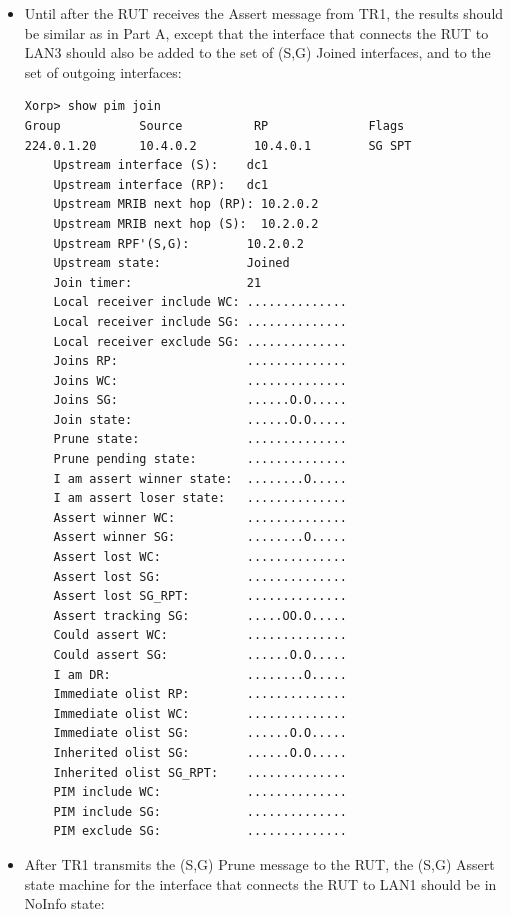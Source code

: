 \documentclass[11pt]{report}
\begin{document}

\begin{itemize}

  \item Until after the RUT receives the Assert message from TR1, the results
  should be similar as in Part A, except that the interface that connects the
  RUT to LAN3 should also be added to the set of (S,G) Joined interfaces, and
  to the set of outgoing interfaces:

\begin{verbatim}
Xorp> show pim join 
Group           Source          RP              Flags
224.0.1.20      10.4.0.2        10.4.0.1        SG SPT 
    Upstream interface (S):    dc1
    Upstream interface (RP):   dc1
    Upstream MRIB next hop (RP): 10.2.0.2
    Upstream MRIB next hop (S):  10.2.0.2
    Upstream RPF'(S,G):        10.2.0.2
    Upstream state:            Joined 
    Join timer:                21
    Local receiver include WC: ..............
    Local receiver include SG: ..............
    Local receiver exclude SG: ..............
    Joins RP:                  ..............
    Joins WC:                  ..............
    Joins SG:                  ......O.O.....
    Join state:                ......O.O.....
    Prune state:               ..............
    Prune pending state:       ..............
    I am assert winner state:  ........O.....
    I am assert loser state:   ..............
    Assert winner WC:          ..............
    Assert winner SG:          ........O.....
    Assert lost WC:            ..............
    Assert lost SG:            ..............
    Assert lost SG_RPT:        ..............
    Assert tracking SG:        .....OO.O.....
    Could assert WC:           ..............
    Could assert SG:           ......O.O.....
    I am DR:                   ........O.....
    Immediate olist RP:        ..............
    Immediate olist WC:        ..............
    Immediate olist SG:        ......O.O.....
    Inherited olist SG:        ......O.O.....
    Inherited olist SG_RPT:    ..............
    PIM include WC:            ..............
    PIM include SG:            ..............
    PIM exclude SG:            ..............
\end{verbatim}

  \item After TR1 transmits the (S,G) Prune message to the RUT, the (S,G)
  Assert state machine for the interface that connects the RUT to LAN1 should
  be in NoInfo state:


\end{itemize}
\end{document}
